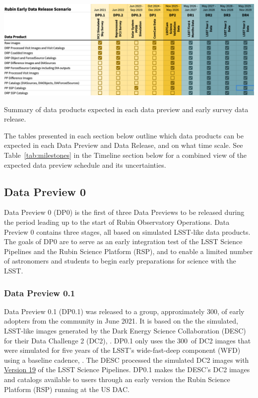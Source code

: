 \begin{table}[ht]
\centering
\includegraphics[width=\linewidth]{figures/DPR-summary}
\caption{Summary of data products expected in each data preview and early survey data release.}
\label{tab:data-preview-summary}
\end{table}

The tables presented in each section below outline which data products can be expected in each Data Preview and Data Release, and on what time scale.
See Table~\ref{tab:milestones} in the Timeline section below for a combined view of the expected data preview schedule and its uncertainties.

\subsection{Data Preview 0}
\label{sec:dp0}

Data Preview 0 (DP0) is the first of three Data Previews to be released during the period leading up to the start of Rubin Observatory Operations. 
Data Preview 0 contains three stages, all based on simulated LSST-like data products. 
The goals of DP0 are to serve as an early integration test of the LSST Science Pipelines and the Rubin Science Platform (RSP), and to enable a limited number of astronomers and students to begin early preparations for science with the LSST.

\subsubsection{Data Preview 0.1}
\label{sec:dp01}

Data Preview 0.1 (DP0.1) was released to a group, approximately 300,  of early adopters from the community in June 2021. 
It is based on the the simulated, LSST-like images generated by the Dark Energy Science Collaboration (DESC) for their Data Challenge 2 (DC2), \citep{2021ApJS..253...31L}. 
DP0.1 only uses the 300~\sqdeg of DC2 images that were simulated for five years of the LSST’s wide-fast-deep component (WFD) using a baseline cadence, .
The DESC processed the simulated DC2 images with \href{https://pipelines.lsst.io/v/v19_0_0/index.html}{Version 19} of the LSST Science Pipelines. 
DP0.1 makes the DESC’s DC2 images and catalogs available to users through an early version the Rubin Science Platform (RSP) running at the US DAC. 

